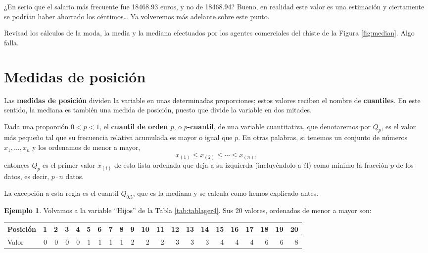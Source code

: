 \documentclass[
]{book}
\theoremstyle{definition}
\theoremstyle{definition}
\newtheorem{example}{Ejemplo}[chapter]
\theoremstyle{definition}
\theoremstyle{definition}
\theoremstyle{remark}
\begin{document}
\begin{rmdromans}
¿En serio que el salario más frecuente fue 18468.93 euros, y no de 18468.94? Bueno, en realidad este valor es una estimación y ciertamente se podrían haber ahorrado los céntimos\ldots{} Ya volveremos más adelante sobre este punto.
\end{rmdromans}

\begin{rmdexercici}
Revisad los cálculos de la moda, la media y la mediana efectuados por los agentes comerciales del chiste de la Figura \ref{fig:median}. Algo falla.
\end{rmdexercici}

\hypertarget{medidas-de-posiciuxf3n}{%
\section{Medidas de posición}\label{medidas-de-posiciuxf3n}}

Las \textbf{medidas de posición} dividen la variable en unas determinadas proporciones; estos valores reciben el nombre de \textbf{cuantiles}. En este sentido, la mediana es también una medida de posición, puesto que divide la variable en dos mitades.

Dada una proporción \(0<p<1\), el \textbf{cuantil de orden \(p\)}, o \textbf{\(p\)-cuantil}, de una variable cuantitativa, que denotaremos por \(Q_p\), es el valor más pequeño tal que su frecuencia relativa acumulada es mayor o igual que \(p\). En otras palabras, si tenemos un conjunto de números \(x_1, \ldots, x_n\) y los ordenamos de menor a mayor,
\[
x_{(1)}\leqslant x_{(2)}\leqslant \cdots \leqslant x_{(n)},
\]
entonces \(Q_p\) es el primer valor \(x_{(i)}\) de esta lista ordenada que deja a su izquierda (incluyéndolo a él) como mínimo la fracción \(p\) de los datos, es decir, \(p\cdot n\) datos.

\begin{rmdimportant}
La excepción a esta regla es el cuantil \(Q_{0.5}\), que es la mediana y se calcula como hemos explicado antes.
\end{rmdimportant}

\begin{example}
\protect\hypertarget{exm:unnamed-chunk-258}{}\label{exm:unnamed-chunk-258}Volvamos a la variable ``Hijos'' de la Tabla \ref{tab:tablager4}. Sus 20 valores, ordenados de menor a mayor son:
\end{example}

\begin{tabular}{l|r|r|r|r|r|r|r|r|r|r|r|r|r|r|r|r|r|r|r|r}
\hline
Posición & 1 & 2 & 3 & 4 & 5 & 6 & 7 & 8 & 9 & 10 & 11 & 12 & 13 & 14 & 15 & 16 & 17 & 18 & 19 & 20\\
\hline
Valor & 0 & 0 & 0 & 0 & 1 & 1 & 1 & 1 & 2 & 2 & 2 & 3 & 3 & 3 & 4 & 4 & 4 & 6 & 6 & 8\\
\hline
\end{tabular}
\end{document}
